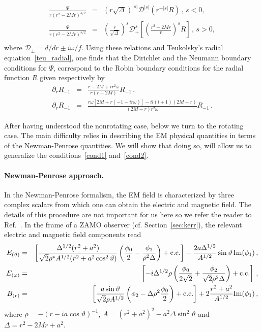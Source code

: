 \documentclass[11pt]{article}
\def\beq{\begin{eqnarray}}
\def\eeq{\end{eqnarray}}
\newcommand{\nn}{\nonumber}
\numberwithin{equation}{section} %
\begin{document}
%
\begin{eqnarray}
\frac{\Psi}{r(r^2-2Mr)^{s/2}}&=&\left(r\sqrt{\Delta}\right)^{|s|}\mathcal{D}_-^{|s|}\left(r^{-|s|}R\right)\,,\, s<0,\nn\\
\frac{\Psi}{r(r^2-2Mr)^{s/2}}&=&\left(\frac{r}{\sqrt{\Delta}}\right)^{s}\mathcal{D}_+^{s}\left[\left(\frac{r^2-2Mr}{r}\right)^{s}R\right]\,,\, s>0,\nn\\\label{hughes}
\end{eqnarray}
%
where $\mathcal{D}_{\pm}=d/dr\pm i \omega/f$. Using these relations and Teukolsky's radial equation~\eqref{teu_radial}, one finds that the Dirichlet and the Neumann boundary conditions for $\Psi$, correspond to the Robin boundary conditions for the radial function $R$ given respectively by
%
\beq
\partial_r R_{-1}&=&\frac{r-2M+i r^2\omega}{r(r-2M)}R_{-1}\,,\label{cond1}\\
\partial_r R_{-1}&=&\frac{r\omega[2M+r(-1-i r \omega)]-i l(l+1) (2M-r)}{(2M-r)r^2\omega}R_{-1}\,.\label{cond2}
\eeq
%

After having understood the nonrotating case, below we turn to the rotating case. The main difficulty relies in 
describing the EM physical quantities in terms of the Newman-Penrose quantities. We will show that doing so, will allow 
us to generalize the conditions~\eqref{cond1} and~\eqref{cond2}. 


\paragraph{Newman-Penrose approach.}
In the Newman-Penrose formalism, the EM field is characterized by three complex scalars from which one can obtain the 
electric and magnetic field. The details of this procedure are not important for us here so we refer the reader to 
Ref.~\cite{King:1977}. In the frame of a ZAMO observer (cf. Section~\ref{sec:kerr}), the relevant electric and magnetic 
field components read~\cite{King:1977}
%
\beq
E_{(\vartheta)}&=&\left[\frac{\Delta^{1/2}(r^2+a^2)}{\sqrt{2}\rho^* A^{1/2}(r^2+a^2\cos^2\vartheta)}\left(\frac{\phi_0}{2}-\frac{\phi_2}{\rho^2\Delta}\right)+{\rm c.c.}\right]
-\frac{2 a \Delta^{1/2}}{A^{1/2}}\sin\vartheta\, {\rm Im}(\phi_1)\,,\nn\\
%
E_{(\varphi)}&=&\left[-i\Delta^{1/2}\rho\left(\frac{\phi_0}{2\sqrt{2}}+\frac{\phi_2}{\sqrt{2}\rho^2\Delta}\right)+{\rm c.c.}\right]\,,\nn\\
%
B_{(r)}&=&\left[\frac{a\sin\vartheta}{\sqrt{2}\rho A^{1/2}}\left(\phi_2-\Delta\rho^2\frac{\phi_0}{2}\right)+{\rm c.c.}\right]
+2\frac{r^2+a^2}{A^{1/2}}{\rm Im}(\phi_1)\,,
\eeq
%
where $\rho=-(r-i a\cos\vartheta)^{-1}$, $A=(r^2+a^2)^2-a^2\Delta\sin^2\vartheta$ and $\Delta=r^2-2Mr+a^2$.
\end{document}
